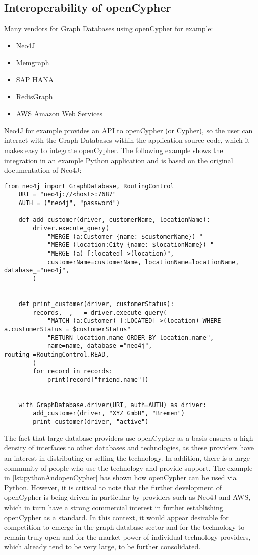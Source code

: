 \subsection{Interoperability of openCypher}
Many vendors for Graph Databases using openCypher for example:
\begin{itemize}
	\item Neo4J
	\item Memgraph
	\item SAP HANA
	\item RedisGraph
	\item AWS Amazon Web Services
\end{itemize}
Neo4J for example provides an API to openCypher (or Cypher), so the user can interact
with the Graph Databases within the application source code, which it makes easy to 
integrate openCypher. The following example shows the integration in an example Python application
and is based on the original documentation of Neo4J:
\begin{lstlisting}[caption={Interact with Cypher via Python}, label={lst:pythonAndopenCypher}] 
	from neo4j import GraphDatabase, RoutingControl
	URI = "neo4j://<host>:7687"
	AUTH = ("neo4j", "password")
	
	def add_customer(driver, customerName, locationName):
		driver.execute_query(
			"MERGE (a:Customer {name: $customerName}) "
			"MERGE (location:City {name: $locationName}) "
			"MERGE (a)-[:located]->(location)",
			customerName=customerName, locationName=locationName, database_="neo4j",
		)


	def print_customer(driver, customerStatus):
		records, _, _ = driver.execute_query(
			"MATCH (a:Customer)-[:LOCATED]->(location) WHERE a.customerStatus = $customerStatus"
			"RETURN location.name ORDER BY location.name",
			name=name, database_="neo4j", routing_=RoutingControl.READ,
		)
		for record in records:
			print(record["friend.name"])


	with GraphDatabase.driver(URI, auth=AUTH) as driver:
		add_customer(driver, "XYZ GmbH", "Bremen")
		print_customer(driver, "active")
\end{lstlisting}
\newpage 
The fact that large database providers use openCypher as a basis ensures a high density of interfaces 
to other databases and technologies, 
as these providers have an interest in distributing or selling the technology. 
In addition, there is a large community of people who use the technology and provide support. 
The example in \cref{lst:pythonAndopenCypher} has shown how openCypher can be used via Python.\newline 
However, it is critical to note that the further development of openCypher 
is being driven in particular by providers such as Neo4J and AWS, 
which in turn have a strong commercial interest in further establishing openCypher as a standard.
In this context, it would appear desirable 
for competition to emerge in the graph database sector and for the technology 
to remain truly open and for the market 
power of individual technology providers, 
which already tend to be very large, to be further consolidated. 


